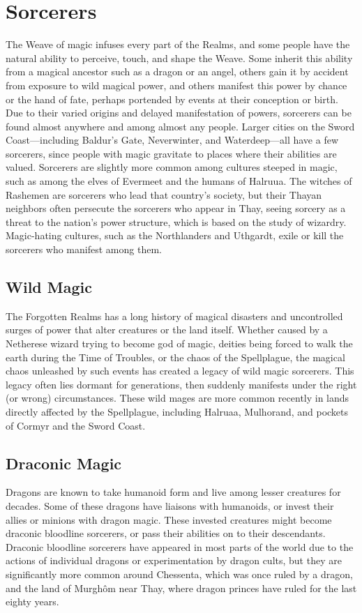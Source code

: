 \documentclass[10pt,a4paper,twoside,twocolumn,openany,bg=print,nodeprecatedcode]{dndbook}
\begin{document}
\section{Sorcerers}
The Weave of magic infuses every part of the Realms, and some people have the natural ability to perceive, touch, and shape the Weave. Some inherit this ability from a magical ancestor such as a dragon or an angel, others gain it by accident from exposure to wild magical power, and others manifest this power by chance or the hand of fate, perhaps portended by events at their conception or birth.
Due to their varied origins and delayed manifestation of powers, sorcerers can be found almost anywhere and among almost any people. Larger cities on the Sword Coast—including Baldur's Gate, Neverwinter, and Waterdeep—all have a few sorcerers, since people with magic gravitate to places where their abilities are valued. Sorcerers are slightly more common among cultures steeped in magic, such as among the elves of Evermeet and the humans of Halruua. The witches of Rashemen are sorcerers who lead that country's society, but their Thayan neighbors often persecute the sorcerers who appear in Thay, seeing sorcery as a threat to the nation's power structure, which is based on the study of wizardry. Magic-hating cultures, such as the Northlanders and Uthgardt, exile or kill the sorcerers who manifest among them.
\subsection{Wild Magic}
The Forgotten Realms has a long history of magical disasters and uncontrolled surges of power that alter creatures or the land itself. Whether caused by a Netherese wizard trying to become god of magic, deities being forced to walk the earth during the Time of Troubles, or the chaos of the Spellplague, the magical chaos unleashed by such events has created a legacy of wild magic sorcerers. This legacy often lies dormant for generations, then suddenly manifests under the right (or wrong) circumstances. These wild mages are more common recently in lands directly affected by the Spellplague, including Halruaa, Mulhorand, and pockets of Cormyr and the Sword Coast.
\subsection{Draconic Magic}
Dragons are known to take humanoid form and live among lesser creatures for decades. Some of these dragons have liaisons with humanoids, or invest their allies or minions with dragon magic. These invested creatures might become draconic bloodline sorcerers, or pass their abilities on to their descendants. Draconic bloodline sorcerers have appeared in most parts of the world due to the actions of individual dragons or experimentation by dragon cults, but they are significantly more common around Chessenta, which was once ruled by a dragon, and the land of Murghôm near Thay, where dragon princes have ruled for the last eighty years.
\end{document}
